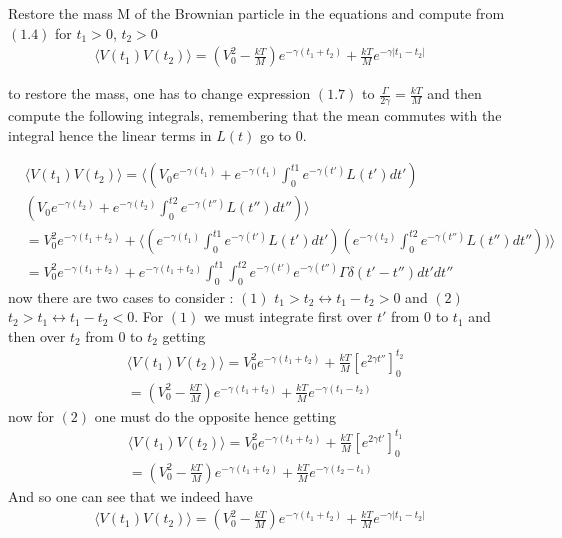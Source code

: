 

Restore the mass M of the Brownian particle in the equations and compute from $(1.4)$ for $t_1>0$, $t_2>0$
\begin{align*}
\langle V(t_1)V(t_2) \rangle=\left( V_0^2-\frac{kT}{M}\right)e^{-\gamma (t_1+t_2)}+\frac{kT}{M}e^{-\gamma |t_1-t_2|}
\end{align*}



to restore the mass, one has to change expression $(1.7)$ to $\frac{\Gamma}{2\gamma}=\frac{kT}{M}$ and then compute the following integrals, remembering that the mean commutes with the integral hence the linear terms in $L(t)$ go to $0$.

\begin{align*}
& \langle V(t_1)V(t_2) \rangle=\langle (V_0e^{-\gamma (t_1)}+ e^{-\gamma (t_1)}\int_0^{t1}e^{-\gamma (t')}L(t')dt') \\
& (V_0e^{-\gamma (t_2)} + e^{-\gamma (t_2)}\int_0^{t2}e^{-\gamma (t'')}L(t'')dt'') \rangle \\
& =V_0^2e^{-\gamma (t_1+t_2)}+\langle (e^{-\gamma (t_1)}\int_0^{t1}e^{-\gamma (t')}L(t')dt')(e^{-\gamma (t_2)}\int_0^{t2}e^{-\gamma (t'')}L(t'')dt'')) \rangle \\
& =V_0^2e^{-\gamma (t_1+t_2)}+e^{-\gamma (t_1+t_2)}\int_0^{t1}\int_0^{t2}e^{-\gamma (t')}e^{-\gamma (t'')}\Gamma \delta(t'-t'')dt'dt''
\end{align*}
now there are two cases to consider : $(1)$ $t_1>t_2 \leftrightarrow t_1-t_2>0$ and $(2)$ $t_2>t_1 \leftrightarrow t_1-t_2<0$. For $(1)$ we must integrate first over $t'$ from $0$ to $t_1$ and then over $t_2$ from $0$ to $t_2$ getting
\begin{align*}
& \langle V(t_1)V(t_2) \rangle=V_0^2e^{-\gamma (t_1+t_2)}+ \frac{kT}{M}[e^{2\gamma t''}]_0^{t_2} \\
& =\left( V_0^2-\frac{kT}{M}\right)e^{-\gamma (t_1+t_2)}+\frac{kT}{M}e^{-\gamma (t_1-t_2)}
\end{align*}
now for $(2)$ one must do the opposite hence getting
\begin{align*}
& \langle V(t_1)V(t_2) \rangle=V_0^2e^{-\gamma (t_1+t_2)}+ \frac{kT}{M}[e^{2\gamma t'}]_0^{t_1} \\
& =\left( V_0^2-\frac{kT}{M}\right)e^{-\gamma (t_1+t_2)}+\frac{kT}{M}e^{-\gamma (t_2-t_1)}
\end{align*}
And so one can see that we indeed have
\begin{align*}
\langle V(t_1)V(t_2) \rangle=\left( V_0^2-\frac{kT}{M}\right)e^{-\gamma (t_1+t_2)}+\frac{kT}{M}e^{-\gamma |t_1-t_2|}
\end{align*}
